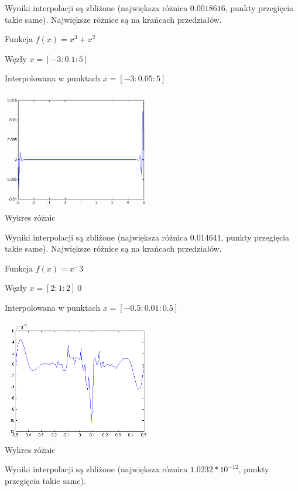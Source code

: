 \documentclass[12pt,a4paper,notitlepage]{article}
\begin{document}
\begin{description}
Wyniki interpolacji są zbliżone (największa różnica $0.0018616$, punkty przegięcia takie same). Największe różnice są na krańcach przedziałów.

Funkcja $f(x) = x^3 + x^2$

Węzły $x = [-3:0.1:5]$

Interpolowana w punktach $x = [-3:0.05:5]$

\begin{center}
\includegraphics[width=0.5\textwidth]{spline4.png}\\
Wykres różnic
\end{center}

Wyniki interpolacji są zbliżone (największa różnica $0.014641$, punkty przegięcia takie same). Największe różnice są na krańcach przedziałów.

Funkcja $f(x) = x^-3$

Węzły $x = [2:1:2] \ 0$

Interpolowana w punktach $x = [-0.5:0.01:0.5]$

\begin{center}
\includegraphics[width=0.5\textwidth]{spline5.png}\\
Wykres różnic
\end{center}

Wyniki interpolacji są zbliżone (największa róznica $1.0232 * 10^{-12}$, punkty przegięcia takie same).
\end{description}
\end{document}
